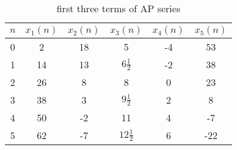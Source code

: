 

\begin{table}[h]
  \centering
  \begin{tabular}{|c|c|c|c|c|c| }
    \hline
    \(n\) & \(x_1(n)\)& \(x_2(n)\) & \(x_3(n)\) & \(x_4(n)\) & \(x_5(n)\) \\
    \hline
    0 & 2  & 18 &  5  &  -4  &  53  \\
    1 & 14 & 13 & $6\frac{1}{2}$ & -2 & 38 \\
    2 & 26 & 8 & 8 & 0 & 23 \\
    3 & 38 & 3 & $9\frac{1}{2}$ & 2 & 8 \\
    4 & 50 & -2 & 11 & 4 & -7 \\
    5 & 62 & -7 & $12\frac{1}{2}$ & 6 & -22 \\
    \hline
  \end{tabular}
  \caption{first three terms of AP series}
  \label{tab:xn}
\end{table}


